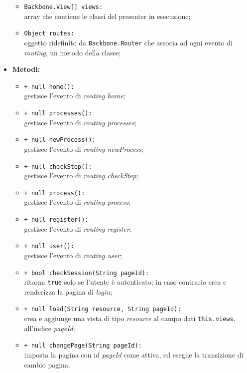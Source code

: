 \begin{flushleft}
\begin{itemize}
\begin{sloppypar}
\begin{itemize}
\item \texttt{Backbone.View[] views:}\\ array che contiene le classi del presenter in esecuzione;
\item \texttt{Object routes:}\\ oggetto ridefinito da \texttt{Backbone.Router} che associa ad ogni evento di \textit{routing}, un metodo della classe;
\end{itemize}
\end{sloppypar}
\item \textbf{Metodi:}
\begin{sloppypar}
\begin{itemize}
\item \texttt{+ null home():}\\ gestisce l'evento di \textit{routing home};
\item \texttt{+ null processes():}\\ gestisce l'evento di \textit{routing processes};
\item \texttt{+ null newProcess():}\\ gestisce l'evento di \textit{routing newProcess};
\item \texttt{+ null checkStep():}\\ gestisce l'evento di \textit{routing checkStep};
\item \texttt{+ null process():}\\ gestisce l'evento di \textit{routing process};
\item \texttt{+ null register():}\\ gestisce l'evento di \textit{routing register};
\item \texttt{+ null user():}\\ gestisce l'evento di \textit{routing user};
\item \texttt{+ bool checkSession(String pageId):}\\ ritorna \texttt{true} solo se l'utente è autenticato; in caso contrario crea e renderizza la pagina di \textit{login};
\item \texttt{+ null load(String resource, String pageId):}\\ crea e aggiunge una vista di tipo \textit{resource} al campo dati \texttt{this.views}, all'indice \textit{pageId};
\item \texttt{+ null changePage(String pageId):}\\ imposta la pagina con id \textit{pageId} come attiva, ed esegue la transizione di cambio pagina.
\end{itemize}
\end{sloppypar}
\end{itemize}
\end{flushleft}

